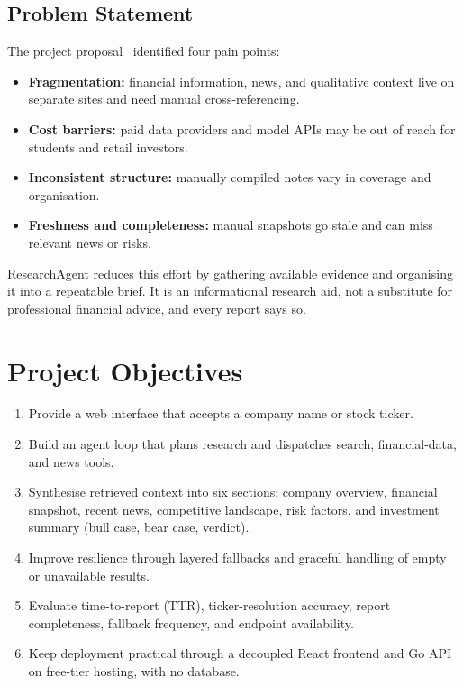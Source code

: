 \documentclass[12pt,a4paper,oneside]{report}
\begin{document}
\subsection{Problem Statement}
The project proposal~\cite{proposal} identified four pain points:
\begin{itemize}[leftmargin=*]
\item \textbf{Fragmentation:} financial information, news, and qualitative context live on separate sites and need manual cross-referencing.
\item \textbf{Cost barriers:} paid data providers and model APIs may be out of reach for students and retail investors.
\item \textbf{Inconsistent structure:} manually compiled notes vary in coverage and organisation.
\item \textbf{Freshness and completeness:} manual snapshots go stale and can miss relevant news or risks.
\end{itemize}
ResearchAgent reduces this effort by gathering available evidence and organising it into a repeatable brief. It is an informational research aid, not a substitute for professional financial advice, and every report says so.

\section{Project Objectives}
\begin{enumerate}[leftmargin=*]
\item Provide a web interface that accepts a company name or stock ticker.
\item Build an agent loop that plans research and dispatches search, financial-data, and news tools.
\item Synthesise retrieved context into six sections: company overview, financial snapshot, recent news, competitive landscape, risk factors, and investment summary (bull case, bear case, verdict).
\item Improve resilience through layered fallbacks and graceful handling of empty or unavailable results.
\item Evaluate time-to-report (TTR), ticker-resolution accuracy, report completeness, fallback frequency, and endpoint availability.
\item Keep deployment practical through a decoupled React frontend and Go API on free-tier hosting, with no database.
\end{enumerate}
\end{document}
